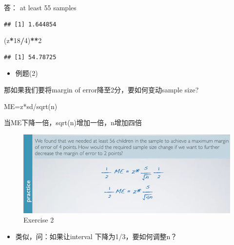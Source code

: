 \documentclass[]{book}
\newenvironment{Shaded}{\begin{snugshade}}{\end{snugshade}}
\newcommand{\KeywordTok}[1]{\textcolor[rgb]{0.13,0.29,0.53}{\textbf{#1}}}
\newcommand{\DecValTok}[1]{\textcolor[rgb]{0.00,0.00,0.81}{#1}}
\newcommand{\FloatTok}[1]{\textcolor[rgb]{0.00,0.00,0.81}{#1}}
\newcommand{\StringTok}[1]{\textcolor[rgb]{0.31,0.60,0.02}{#1}}
\newcommand{\CommentTok}[1]{\textcolor[rgb]{0.56,0.35,0.01}{\textit{#1}}}
\newcommand{\OperatorTok}[1]{\textcolor[rgb]{0.81,0.36,0.00}{\textbf{#1}}}
\newcommand{\NormalTok}[1]{#1}
\providecommand{\tightlist}{%
  \setlength{\itemsep}{0pt}\setlength{\parskip}{0pt}}
\begin{document}
答： at least 55 samples

\begin{Shaded}
\end{Shaded}

\begin{verbatim}
## [1] 1.644854
\end{verbatim}

\begin{Shaded}
\begin{Highlighting}[]
\NormalTok{(z}\OperatorTok{*}\DecValTok{18}\OperatorTok{/}\DecValTok{4}\NormalTok{)}\OperatorTok{**}\DecValTok{2}
\end{Highlighting}
\end{Shaded}

\begin{verbatim}
## [1] 54.78725
\end{verbatim}

\begin{itemize}
\tightlist
\item
  例题(2)
\end{itemize}

那如果我们要将margin of error降至2分，要如何变动sample size?

ME=z*sd/sqrt(n)

当ME下降一倍，sqrt(n)增加一倍，n增加四倍

\begin{figure}

{\centering \includegraphics[width=0.8\linewidth]{graphs/2-14} 

}

\caption{Exercise 2}\label{fig:fig2-14}
\end{figure}

\begin{itemize}
\tightlist
\item
  类似，问：如果让interval 下降为1/3，要如何调整n？
\end{itemize}
\end{document}
